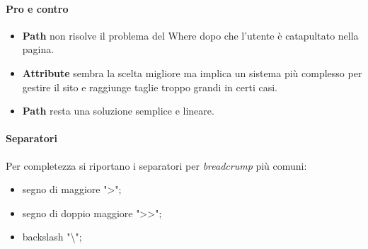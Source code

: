 				\paragraph{Pro e contro}
					\begin{itemize}
						\item \textbf{Path} non risolve il problema del Where dopo che l'utente è catapultato nella pagina.
						\item \textbf{Attribute} sembra la scelta migliore ma implica un sistema più complesso per gestire il sito e raggiunge taglie troppo grandi in certi casi.
						\item \textbf{Path} resta una soluzione semplice e lineare.
					\end{itemize}
				
				\paragraph{Separatori}
					Per completezza si riportano i separatori per \emph{breadcrump} più comuni:
					\begin{itemize}
						\item segno di maggiore ">";
						\item segno di doppio maggiore ">>";
						\item backslash "\textbackslash";
					\end{itemize}
				